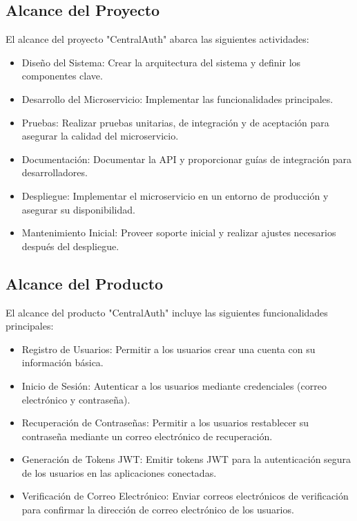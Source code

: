 \documentclass{article}
\begin{document}
\subsection{Alcance del Proyecto}

El alcance del proyecto "CentralAuth" abarca las siguientes actividades:
\begin{itemize}
    \item Diseño del Sistema: Crear la arquitectura del sistema y definir los componentes clave.
    \item Desarrollo del Microservicio: Implementar las funcionalidades principales.
    \item Pruebas: Realizar pruebas unitarias, de integración y de aceptación para asegurar la calidad del microservicio.
    \item Documentación: Documentar la API y proporcionar guías de integración para desarrolladores.
    \item Despliegue: Implementar el microservicio en un entorno de producción y asegurar su disponibilidad.
    \item Mantenimiento Inicial: Proveer soporte inicial y realizar ajustes necesarios después del despliegue.
\end{itemize}

\subsection{Alcance del Producto}

El alcance del producto "CentralAuth" incluye las siguientes funcionalidades principales:
\begin{itemize}
    \item Registro de Usuarios: Permitir a los usuarios crear una cuenta con su información básica.
    \item Inicio de Sesión: Autenticar a los usuarios mediante credenciales (correo electrónico y contraseña).
    \item Recuperación de Contraseñas: Permitir a los usuarios restablecer su contraseña mediante un correo electrónico de recuperación.
    \item Generación de Tokens JWT: Emitir tokens JWT para la autenticación segura de los usuarios en las aplicaciones conectadas.
    \item Verificación de Correo Electrónico: Enviar correos electrónicos de verificación para confirmar la dirección de correo electrónico de los usuarios.
\end{itemize}
\end{document}
